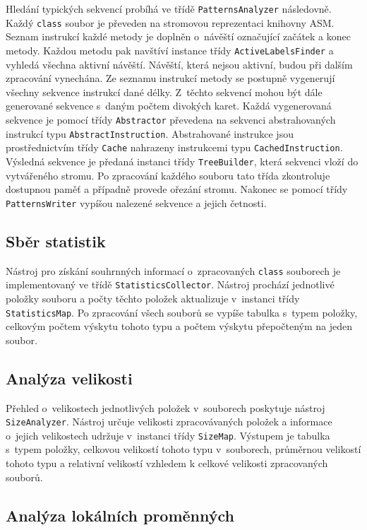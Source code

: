Hledání typických sekvencí probíhá ve třídě \texttt{PatternsAnalyzer} následovně. Každý \texttt{class} soubor je převeden na stromovou reprezentaci knihovny ASM. Seznam instrukcí každé metody je doplněn o~návěští označující začátek a konec metody. Každou metodu pak navštíví instance třídy \texttt{ActiveLabelsFinder} a vyhledá všechna aktivní návěští. Návěští, která nejsou aktivní, budou při dalším zpracování vynechána. Ze seznamu instrukcí metody se postupně vygenerují všechny sekvence instrukcí dané délky. Z~těchto sekvencí mohou být dále generované sekvence s~daným počtem divokých karet. Každá vygenerovaná sekvence je pomocí třídy \texttt{Abstractor} převedena na sekvenci abstrahovaných instrukcí typu \texttt{AbstractInstruction}. Abstrahované instrukce jsou prostřednictvím třídy \texttt{Cache} nahrazeny instrukcemi typu \texttt{CachedInstruction}. Výsledná sekvence je předaná instanci třídy \texttt{TreeBuilder}, která sekvenci vloží do vytvářeného stromu. Po zpracování každého souboru tato třída zkontroluje dostupnou paměť a případně provede ořezání stromu. Nakonec se pomocí třídy \texttt{PatternsWriter} vypíšou nalezené sekvence a jejich četnosti.

\subsection{Sběr statistik}

Nástroj pro získání souhrnných informací o~zpracovaných \texttt{class} souborech je implementovaný ve třídě \texttt{StatisticsCollector}. Nástroj prochází jednotlivé položky souboru a  počty těchto položek aktualizuje v~instanci třídy \texttt{StatisticsMap}. Po zpracování všech souborů se vypíše tabulka s~typem položky, celkovým počtem výskytu tohoto typu a počtem výskytu přepočteným na jeden soubor. 

\subsection{Analýza velikosti}

Přehled o~velikostech jednotlivých položek v~souborech poskytuje nástroj \texttt{SizeAnalyzer}. Nástroj určuje velikosti zpracovávaných položek a informace o~jejich velikostech udržuje v~instanci třídy \texttt{SizeMap}. Výstupem je tabulka s~typem položky, celkovou velikostí tohoto typu v~souborech, průměrnou velikostí tohoto typu a relativní velikostí vzhledem k celkové velikosti zpracovaných souborů. 

\subsection{Analýza lokálních proměnných}

